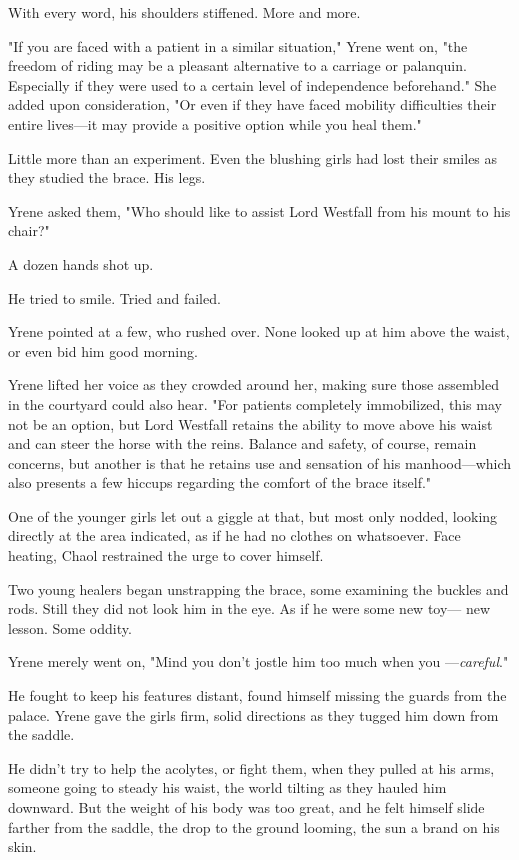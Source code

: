 With every word, his shoulders stiffened.
More and more.

"If you are faced with a patient in a similar situation," Yrene went on, "the freedom of riding may be a pleasant alternative to a carriage or palanquin.
Especially if they were used to a certain level of independence beforehand."
She added upon consideration, "Or even if they have faced mobility difficulties their entire lives---it may provide a positive option while you heal them."

Little more than an experiment.
Even the blushing girls had lost their smiles as they studied the brace.
His legs.

Yrene asked them, "Who should like to assist Lord Westfall from his mount to his chair?"

A dozen hands shot up.

He tried to smile.
Tried and failed.

Yrene pointed at a few, who rushed over.
None looked up at him above the waist, or even bid him good morning.

Yrene lifted her voice as they crowded around her, making sure those assembled in the courtyard could also hear.
"For patients completely immobilized, this may not be an option, but Lord Westfall retains the ability to move above his waist and can steer the horse with the reins.
Balance and safety, of course, remain concerns, but another is that he retains use and sensation of his manhood---which also presents a few hiccups regarding the comfort of the brace itself."

One of the younger girls let out a giggle at that, but most only nodded, looking directly at the area indicated, as if he had no clothes on whatsoever.
Face heating, Chaol restrained the urge to cover himself.

Two young healers began unstrapping the brace, some examining the buckles and rods.
Still they did not look him in the eye.
As if he were some new toy--- new lesson.
Some oddity.

Yrene merely went on, "Mind you don't jostle him too much when you ---\emph{careful}."

He fought to keep his features distant, found himself missing the guards from the palace.
Yrene gave the girls firm, solid directions as they tugged him down from the saddle.

He didn't try to help the acolytes, or fight them, when they pulled at his arms, someone going to steady his waist, the world tilting as they hauled him downward.
But the weight of his body was too great, and he felt himself slide farther from the saddle, the drop to the ground looming, the sun a brand on his skin.

